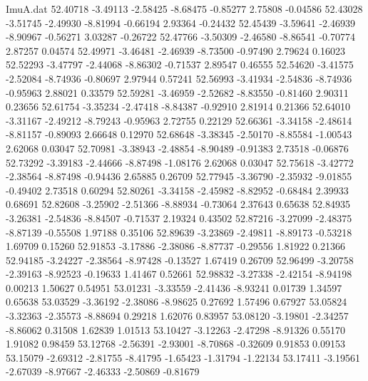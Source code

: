 \begin{filecontents}{ImuA.dat}
  52.40718   -3.49113   -2.58425   -8.68475   -0.85277    2.75808   -0.04586
  52.43028   -3.51745   -2.49930   -8.81994   -0.66194    2.93364   -0.24432
  52.45439   -3.59641   -2.46939   -8.90967   -0.56271    3.03287   -0.26722
  52.47766   -3.50309   -2.46580   -8.86541   -0.70774    2.87257    0.04574
  52.49971   -3.46481   -2.46939   -8.73500   -0.97490    2.79624    0.16023
  52.52293   -3.47797   -2.44068   -8.86302   -0.71537    2.89547    0.46555
  52.54620   -3.41575   -2.52084   -8.74936   -0.80697    2.97944    0.57241
  52.56993   -3.41934   -2.54836   -8.74936   -0.95963    2.88021    0.33579
  52.59281   -3.46959   -2.52682   -8.83550   -0.81460    2.90311    0.23656
  52.61754   -3.35234   -2.47418   -8.84387   -0.92910    2.81914    0.21366
  52.64010   -3.31167   -2.49212   -8.79243   -0.95963    2.72755    0.22129
  52.66361   -3.34158   -2.48614   -8.81157   -0.89093    2.66648    0.12970
  52.68648   -3.38345   -2.50170   -8.85584   -1.00543    2.62068    0.03047
  52.70981   -3.38943   -2.48854   -8.90489   -0.91383    2.73518   -0.06876
  52.73292   -3.39183   -2.44666   -8.87498   -1.08176    2.62068    0.03047
  52.75618   -3.42772   -2.38564   -8.87498   -0.94436    2.65885    0.26709
  52.77945   -3.36790   -2.35932   -9.01855   -0.49402    2.73518    0.60294
  52.80261   -3.34158   -2.45982   -8.82952   -0.68484    2.39933    0.68691
  52.82608   -3.25902   -2.51366   -8.88934   -0.73064    2.37643    0.65638
  52.84935   -3.26381   -2.54836   -8.84507   -0.71537    2.19324    0.43502
  52.87216   -3.27099   -2.48375   -8.87139   -0.55508    1.97188    0.35106
  52.89639   -3.23869   -2.49811   -8.89173   -0.53218    1.69709    0.15260
  52.91853   -3.17886   -2.38086   -8.87737   -0.29556    1.81922    0.21366
  52.94185   -3.24227   -2.38564   -8.97428   -0.13527    1.67419    0.26709
  52.96499   -3.20758   -2.39163   -8.92523   -0.19633    1.41467    0.52661
  52.98832   -3.27338   -2.42154   -8.94198    0.00213    1.50627    0.54951
  53.01231   -3.33559   -2.41436   -8.93241    0.01739    1.34597    0.65638
  53.03529   -3.36192   -2.38086   -8.98625    0.27692    1.57496    0.67927
  53.05824   -3.32363   -2.35573   -8.88694    0.29218    1.62076    0.83957
  53.08120   -3.19801   -2.34257   -8.86062    0.31508    1.62839    1.01513
  53.10427   -3.12263   -2.47298   -8.91326    0.55170    1.91082    0.98459
  53.12768   -2.56391   -2.93001   -8.70868   -0.32609    0.91853    0.09153
  53.15079   -2.69312   -2.81755   -8.41795   -1.65423   -1.31794   -1.22134
  53.17411   -3.19561   -2.67039   -8.97667   -2.46333   -2.50869   -0.81679

\end{filecontents}
